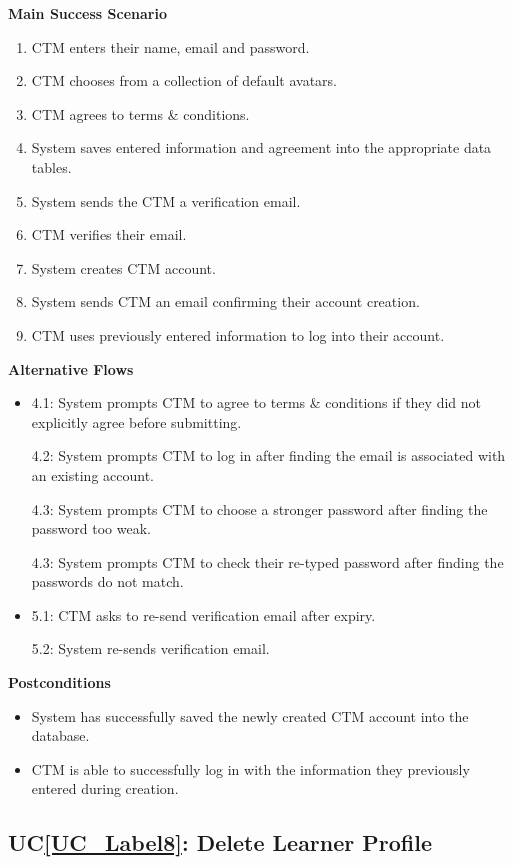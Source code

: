 \documentclass[12pt]{article}
\newcounter{ucnum} %
\newcommand{\ucref}[1]{UC\ref{#1}}
\begin{document}
\textbf{Main Success Scenario}
\begin{enumerate}
\item CTM enters their name, email and password.
\item CTM chooses from a collection of default avatars.
\item CTM agrees to terms \& conditions.
\item System saves entered information and agreement into the appropriate data tables.
\item System sends the CTM a verification email.
\item CTM verifies their email.
\item System creates CTM account.
\item System sends CTM an email confirming their account creation.
\item CTM uses previously entered information to log into their account.
\end{enumerate}

\textbf{Alternative Flows}
\begin{itemize}
\item 4.1: System prompts CTM to agree to terms \& conditions if they did not explicitly agree before submitting.

4.2: System prompts CTM to log in after finding the email is associated with an existing account.

4.3: System prompts CTM to choose a stronger password after finding the password too weak.

4.3: System prompts CTM to check their re-typed password after finding the passwords do not match.

\item 5.1: CTM asks to re-send verification email after expiry.

5.2: System re-sends verification email.

\end{itemize}

\textbf{Postconditions}
\begin{itemize}
\item System has successfully saved the newly created CTM account into the database.
\item CTM is able to successfully log in with the information they previously entered during creation.
\end{itemize}

 \label{UC_Label8}
\subsection{\ucref{UC_Label8}: Delete Learner Profile}
\end{document}
